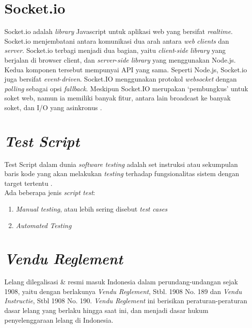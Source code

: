 	\section{  Socket.io}
	Socket.io adalah \textit{library} Javascript untuk aplikasi web yang bersifat \textit{realtime}. Socket.io menjembatani antara komunikasi dua arah antara \textit{web} \textit{clients} dan \textit{server}. Socket.io terbagi menjadi dua bagian, yaitu \textit{client}-\textit{side} \textit{library} yang berjalan di browser client, dan \textit{server}-\textit{side} \textit{library} yang menggunakan Node.js. Kedua komponen tersebut mempunyai API yang sama. Seperti Node.js, Socket.io juga bersifat \textit{event}-\textit{driven}. Socket.IO menggunakan protokol \textit{websocket} dengan \textit{polling} sebagai opsi \textit{fallback}. Meskipun Socket.IO merupakan ‘pembungkus’ untuk soket web, namun ia memiliki banyak fitur, antara lain broadcast ke banyak soket, dan I/O yang asinkronus \cite{noauthor_socket.io_2016}.
	
	\section{  \textit{Test Script}}
	Test Script dalam dunia \textit{software testing} adalah set instruksi atau sekumpulan baris kode yang akan melakukan \textit{testing} terhadap fungsionalitas sistem dengan target tertentu \cite{noauthor_test_2016}.
	\\ \indent Ada beberapa jenis \textit{script test}:
	\begin{enumerate}
	  	\item \textit{Manual testing}, atau lebih sering disebut \textit{test cases}
	  	\item \textit{Automated Testing}
	\end{enumerate}
	
	\section{  \textit{Vendu Reglement}}
	Lelang dilegalisasi \& resmi masuk Indonesia dalam perundang-undangan sejak 1908, yaitu dengan berlakunya \textit{Vendu Reglement}, Stbl. 1908 No. 189 dan \textit{Vendu Instructie}, Stbl 1908 No. 190. \textit{Vendu Reglement} ini berisikan peraturan-peraturan dasar lelang yang berlaku hingga saat ini, dan menjadi dasar hukum penyelenggaraan lelang di Indonesia\cite{balailelang_sejarah_nodate}.
	
